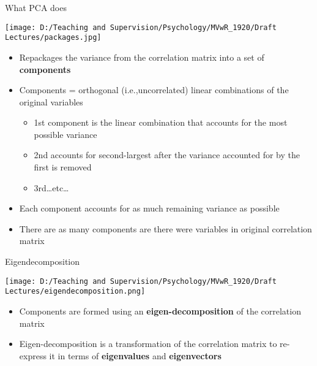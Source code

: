 \documentclass[
  ignorenonframetext,
]{beamer}
\providecommand{\tightlist}{%
  \setlength{\itemsep}{0pt}\setlength{\parskip}{0pt}}
\begin{document}
\begin{frame}{What PCA does}
\protect\hypertarget{what-pca-does}{}

\texttt{[image: D:/Teaching and Supervision/Psychology/MVwR\_1920/Draft Lectures/packages.jpg]}

\begin{itemize}
\tightlist
\item
  Repackages the variance from the correlation matrix into a set of
  \textbf{components}
\item
  Components = orthogonal (i.e.,uncorrelated) linear combinations of the
  original variables

  \begin{itemize}
  \tightlist
  \item
    1st component is the linear combination that accounts for the most
    possible variance
  \item
    2nd accounts for second-largest after the variance accounted for by
    the first is removed
  \item
    3rd\ldots etc\ldots{}
  \end{itemize}
\item
  Each component accounts for as much remaining variance as possible
\item
  There are as many components are there were variables in original
  correlation matrix
\end{itemize}

\end{frame}

\begin{frame}{Eigendecomposition}
\protect\hypertarget{eigendecomposition}{}

\texttt{[image: D:/Teaching and Supervision/Psychology/MVwR\_1920/Draft Lectures/eigendecomposition.png]}

\begin{itemize}
\tightlist
\item
  Components are formed using an \textbf{eigen-decomposition} of the
  correlation matrix
\item
  Eigen-decomposition is a transformation of the correlation matrix to
  re-express it in terms of \textbf{eigenvalues} and
  \textbf{eigenvectors}
\end{itemize}

\end{frame}
\end{document}
